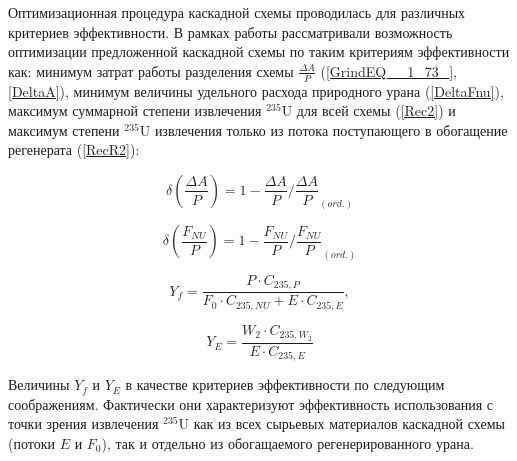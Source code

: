 Оптимизационная процедура каскадной схемы проводилась для различных критериев эффективности. В рамках работы рассматривали возможность оптимизации предложенной каскадной схемы по таким критериям эффективности как: минимум затрат работы разделения схемы $\frac{\Delta A}{P}$ (\ref{GrindEQ__1_73_}, \ref{DeltaA}), минимум величины удельного расхода природного урана (\ref{DeltaFnu}), максимум суммарной степени извлечения $^{235}$U для всей схемы (\ref{Rec2}) и максимум степени $^{235}$U извлечения только из потока поступающего в обогащение регенерата (\ref{RecR2}):

\begin{equation} \label{DeltaA} 
    \delta(\frac{\Delta A}{P})=1-\frac{\Delta A}{P}/\frac{\Delta A}{P}_{(ord.)}
\end{equation}

\begin{equation} \label{DeltaFnu} 
\delta(\frac{F_{NU}}{P})=1-\frac{F_{NU}}{P}/\frac{F_{NU}}{P}_{(ord.)}
\end{equation} 

\begin{equation} \label{Rec2} 
    Y_f = \frac{P \cdot C_{235,P}}{F_0 \cdot C_{235,NU} + E \cdot C_{235,E}}, 
\end{equation} 

\begin{equation} \label{RecR2} 
    Y_{E} = \frac{W_2\cdot C_{235,W_2}}{E \cdot C_{235,E}}        
\end{equation} 

Величины $Y_f$ и $Y_{E}$ в качестве критериев эффективности по следующим соображениям. Фактически они характеризуют эффективность использования с точки зрения извлечения $^{235}$U как из всех сырьевых материалов каскадной схемы (потоки $E$ и $F_0$), так и отдельно из обогащаемого регенерированного урана.

